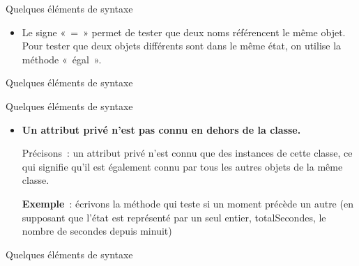 \begin{frame}{Quelques éléments de syntaxe}
	\begin{itemize}	
		\item 
			Le signe «~=~» permet de tester que deux noms référencent le même objet.
			Pour tester que deux objets différents sont dans le même état, on
			utilise la méthode «~égal~».
	\end{itemize}
\end{frame}

\begin{frame}{Quelques éléments de syntaxe}
\end{frame}

\begin{frame}{Quelques éléments de syntaxe}
	\begin{itemize}
		\item 
			\textbf{Un attribut privé n'est pas connu en dehors de la
			classe.}
			
			Précisons~: un attribut privé n'est connu que
			des instances de cette classe, ce qui signifie qu'il
			est également connu par tous les autres objets de la même
			classe.
			
			\smallskip
			\textbf{Exemple}~: 	
			écrivons la méthode qui teste si un moment précède un
			autre (en supposant que l'état est représenté par un
			seul entier, totalSecondes, le nombre de secondes depuis minuit)
	\end{itemize}
\end{frame}

\begin{frame}{Quelques éléments de syntaxe}
\end{frame}


